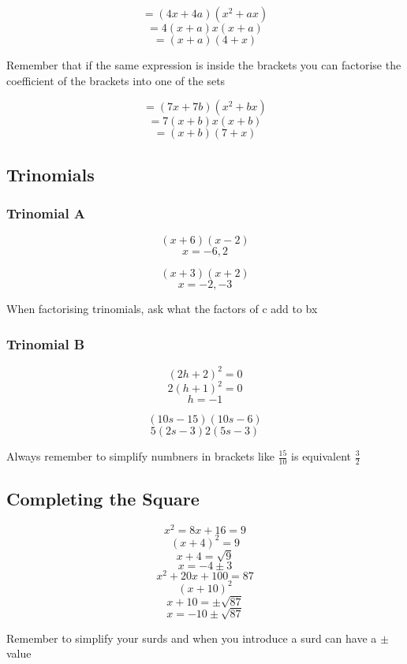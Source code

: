 \documentclass{report}
\begin{document}
$$=(4x+4a)(x^{2}+ax)$$
$$=4(x+a)x(x+a)$$
$$=(x+a)(4+x)$$

\begin{note}
    Remember that if the same expression is inside the brackets
    \newline 
    you can factorise the coefficient of the brackets into one of the sets
\end{note}
$$=(7x+7b)(x^{2}+bx)$$
$$=7(x+b)x(x+b)$$
$$=(x+b)(7 +x)$$

\subsection{Trinomials}
\subsubsection{Trinomial A}

$$(x+6)(x-2)$$
$$x = -6,2$$

$$(x+3)(x+2)$$
$$x= -2,-3$$
\begin{note}
    When factorising trinomials, ask what the factors of c add to bx
\end{note}
\subsubsection{Trinomial B}
$$(2h+2)^{2}= 0$$
$$2(h+1)^{2} = 0$$
$$h = -1$$

$$(10s-15)(10s-6)$$
$$5(2s-3)2(5s-3 )$$
\begin{note}
    Always remember to simplify numbners in brackets  like $\frac{15}{10}$ is equivalent $\frac{3}{2}$
\end{note}
\subsection{Completing the Square}
$$x^{2}=8x+16=9$$
$$(x+4)^2=9$$
$$x+4=\sqrt{9}$$
$$x = -4\pm 3$$
\newpage
{}
$$x^{2}+20x+100=87$$
$$\left(x+10\right)^{2}$$
$$x+10 =\pm\sqrt{87}$$
$$x = -10\pm\sqrt{87}$$
\begin{note}
    Remember to simplify your surds and when you introduce 
    \newline
    a surd can have a $\pm$ value
\end{note}   
\end{document}
